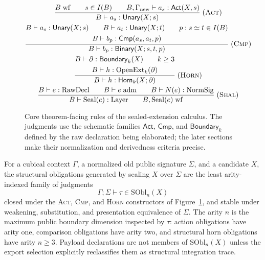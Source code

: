 \documentclass{lmcs}
\newcommand{\RawDecl}{\mathrm{RawDecl}}
\newcommand{\Layer}{\mathrm{Layer}}
\newcommand{\NormSig}{\mathrm{NormSig}}
\newcommand{\SObl}{\mathrm{SObl}}
\newcommand{\OpenExt}{\mathrm{OpenExt}}
\begin{document}
\begin{figure}[t]
\small
\[
\begin{array}{@{}c@{}}
\dfrac{
  B\;\mathrm{wf}
  \qquad s\in I(B)
  \qquad B,\Gamma_{\mathrm{new}}\vdash a_s:\mathsf{Act}(X,s)
}{
  B\vdash a_s:\mathsf{Unary}(X;s)
}
\;(\textsc{Act})
\\[2.2ex]
\dfrac{
  \begin{gathered}
  B\vdash a_s:\mathsf{Unary}(X;s)
  \qquad
  B\vdash a_t:\mathsf{Unary}(X;t)
  \qquad
  p:s\simeq t\in I(B)\\
  B\vdash b_p:\mathsf{Cmp}(a_s,a_t,p)
  \end{gathered}
}{
  B\vdash b_p:\mathsf{Binary}(X;s,t,p)
}
\;(\textsc{Cmp})
\\[2.2ex]
\dfrac{
  \begin{gathered}
  B\vdash \partial:\mathsf{Boundary}_k(X)
  \qquad k\geq 3\\
  B\vdash h:\OpenExt_k(\partial)
  \end{gathered}
}{
  B\vdash h:\mathsf{Horn}_k(X;\partial)
}
\;(\textsc{Horn})
\\[2.2ex]
\dfrac{
  B\vdash e:\RawDecl
  \qquad
  B\vdash e\;\mathrm{adm}
  \qquad
  B\vdash N(e):\NormSig
}{
  B\vdash \mathrm{Seal}(e):\Layer
  \qquad
  B,\mathrm{Seal}(e)\;\mathrm{wf}
}
\;(\textsc{Seal})
\end{array}
\]
\caption{Core theorem-facing rules of the sealed-extension calculus.  The
judgments use the schematic families \(\mathsf{Act}\), \(\mathsf{Cmp}\), and
\(\mathsf{Boundary}_k\) defined by the raw declaration being elaborated; the
later sections make their normalization and derivedness criteria precise.}
\label{fig:core-rules}
\end{figure}

\begin{defi}
\label{def:generated-structural-obligations}
For a cubical context \(\Gamma\), a normalized old public signature \(\Sigma\), and a
candidate \(X\), the structural obligations generated by sealing \(X\) over
\(\Sigma\) are the least arity-indexed family of judgments
\[
  \Gamma;\Sigma\vdash \tau\in\SObl_n(X)
\]
closed under the \textsc{Act}, \textsc{Cmp}, and \textsc{Horn} constructors of
Figure~\ref{fig:core-rules}, and stable under weakening, substitution, and
presentation equivalence of \(\Sigma\).  The arity \(n\) is the maximum public
boundary dimension inspected by \(\tau\): action obligations have arity one,
comparison obligations have arity two, and structural horn obligations have
arity \(n\geq 3\).  Payload declarations are not members of \(\SObl_n(X)\)
unless the export selection explicitly reclassifies them as structural
integration trace.
\end{defi}
\end{document}
